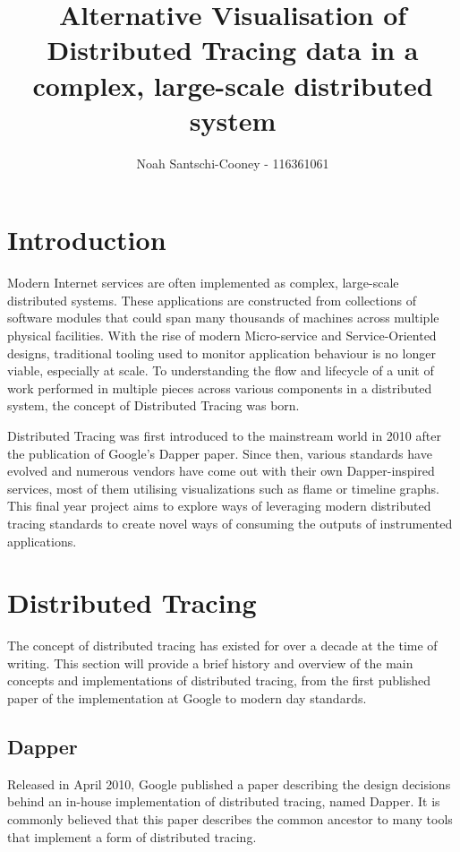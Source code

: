 \documentclass[pdftex,titlepage]{article}
\author{Noah Santschi-Cooney - 116361061}
\title{\textbf{Alternative Visualisation of Distributed Tracing data in a complex, large-scale distributed system}}
\begin{document}
    \maketitle
    \section{Introduction}

    Modern Internet services are often implemented as complex, large-scale distributed systems. 
    These applications are constructed from collections of software modules that could span many
    thousands of machines across multiple physical facilities. With the rise of modern 
    Micro-service and Service-Oriented designs, traditional tooling used to monitor application 
    behaviour is no longer viable, especially at scale. To understanding the flow and lifecycle 
    of a unit of work performed in multiple pieces across various components in a distributed system, 
    the concept of Distributed Tracing was born. 
    
    Distributed Tracing was first introduced to the mainstream world in 2010 after the publication
    of Google’s Dapper paper. Since then, various standards have evolved and numerous vendors have
    come out with their own Dapper-inspired services, most of them utilising visualizations such as
    flame or timeline graphs. This final year project aims to explore ways of leveraging modern 
    distributed tracing standards to create novel ways of consuming the outputs of instrumented applications.

    \section{Distributed Tracing}
    The concept of distributed tracing has existed for over a decade at the time of writing. 
    This section will provide a brief history and overview of the main concepts and implementations of distributed tracing,
    from the first published paper of the implementation at Google to modern day standards.

        \subsection{Dapper}
        Released in April 2010,
        Google published a paper describing the design decisions behind an in-house implementation of distributed tracing,
        named Dapper. It is commonly believed that this paper describes the common ancestor to many tools that implement
        a form of distributed tracing.
\end{document}
